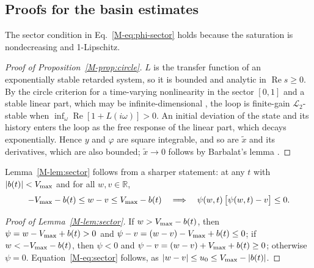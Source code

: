 \subsection{Proofs for the basin estimates}\label{supp:std-proofs}

The sector condition in Eq.~\eqref{M-eq:phi-sector} holds because the saturation is nondecreasing and 1-Lipschitz.
\begin{proof}[Proof of Proposition~\ref{M-prop:circle}]
$L$ is the transfer function of an exponentially stable retarded system, so it is bounded and analytic in $\operatorname{Re}s\ge0$. By the circle criterion for a time-varying nonlinearity in the sector $[0,1]$ and a stable linear part, which may be infinite-dimensional \citep{zames1966inputI,zames1966inputII,desoer1975feedback}, the loop is finite-gain $\mathcal L_2$-stable when $\inf_\omega\operatorname{Re}[1+L(i\omega)]>0$. An initial deviation of the state and its history enters the loop as the free response of the linear part, which decays exponentially. Hence $y$ and $\varphi$ are square integrable, and so are $\tilde x$ and its derivatives, which are also bounded; $\tilde x\to0$ follows by Barbalat's lemma \citep{khalil2002nonlinear}.
\end{proof}

Lemma~\ref{M-lem:sector} follows from a sharper statement: at any $t$ with $\lvert b(t)\rvert<V_{\max}$ and for all $w,v\in\mathbb R$,
\begin{equation}\label{eq:sector-sharp}
-V_{\max}-b(t)\le w-v\le V_{\max}-b(t)\quad\Longrightarrow\quad\psi(w,t)\,\big[\psi(w,t)-v\big]\le0 .
\end{equation}
\begin{proof}[Proof of Lemma~\ref{M-lem:sector}]
If $w>V_{\max}-b(t)$, then $\psi=w-V_{\max}+b(t)>0$ and $\psi-v=(w-v)-V_{\max}+b(t)\le0$; if $w<-V_{\max}-b(t)$, then $\psi<0$ and $\psi-v=(w-v)+V_{\max}+b(t)\ge0$; otherwise $\psi=0$. Equation~\eqref{M-eq:sector} follows, as $\lvert w-v\rvert\le u_0\le V_{\max}-\lvert b(t)\rvert$.
\end{proof}


